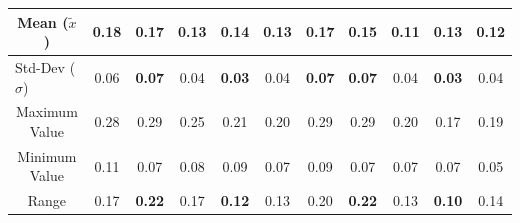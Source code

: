 \begin{itemize}
\begin{table}[htbp]
{\begin{tabular}{@{}ccccccccccc@{}}
      \multicolumn{1}{c|}{Mean ($\tilde{x}$)}                                            & \cellcolor[HTML]{CB0000}\textbf{0.18} & \cellcolor[HTML]{FFFFFF}0.17           & \cellcolor[HTML]{32CB00}\textbf{0.13} & \cellcolor[HTML]{FFFFFF}0.14           & \multicolumn{1}{c|}{\cellcolor[HTML]{32CB00}\textbf{0.13}} & \cellcolor[HTML]{CB0000}\textbf{0.17} & \cellcolor[HTML]{FFFFFF}0.15           & \cellcolor[HTML]{32CB00}\textbf{0.11} & \cellcolor[HTML]{FFFFFF}0.13           & \multicolumn{1}{c|}{\cellcolor[HTML]{FFFFFF}0.12}  \\ \midrule
      \multicolumn{1}{l|}{Std-Dev ($\sigma$)}                                            & \cellcolor[HTML]{FFFFFF}0.06          & \cellcolor[HTML]{CB0000}\textbf{0.07}  & \cellcolor[HTML]{FFFFFF}0.04          & \cellcolor[HTML]{32CB00}\textbf{0.03}  & \multicolumn{1}{c|}{\cellcolor[HTML]{FFFFFF}0.04}          & \cellcolor[HTML]{CB0000}\textbf{0.07} & \cellcolor[HTML]{CB0000}\textbf{0.07}  & \cellcolor[HTML]{FFFFFF}0.04          & \cellcolor[HTML]{32CB00}\textbf{0.03}  & \multicolumn{1}{c|}{\cellcolor[HTML]{FFFFFF}0.04}  \\ \midrule
      \multicolumn{1}{c|}{Maximum Value}                                                 & \cellcolor[HTML]{FFFFFF}0.28          & \cellcolor[HTML]{FFFFFF}0.29           & \cellcolor[HTML]{FFFFFF}0.25          & \cellcolor[HTML]{FFFFFF}0.21           & \multicolumn{1}{c|}{\cellcolor[HTML]{FFFFFF}0.20}          & \cellcolor[HTML]{FFFFFF}0.29          & \cellcolor[HTML]{FFFFFF}0.29           & \cellcolor[HTML]{FFFFFF}0.20          & \cellcolor[HTML]{FFFFFF}0.17           & \multicolumn{1}{c|}{\cellcolor[HTML]{FFFFFF}0.19}  \\ \midrule
      \multicolumn{1}{c|}{Minimum Value}                                                 & \cellcolor[HTML]{FFFFFF}0.11          & \cellcolor[HTML]{FFFFFF}0.07           & \cellcolor[HTML]{FFFFFF}0.08          & \cellcolor[HTML]{FFFFFF}0.09           & \multicolumn{1}{c|}{\cellcolor[HTML]{FFFFFF}0.07}          & \cellcolor[HTML]{FFFFFF}0.09          & \cellcolor[HTML]{FFFFFF}0.07           & \cellcolor[HTML]{FFFFFF}0.07          & \cellcolor[HTML]{FFFFFF}0.07           & \multicolumn{1}{c|}{\cellcolor[HTML]{FFFFFF}0.05}  \\ \midrule
      \multicolumn{1}{c|}{Range}                                                         & \cellcolor[HTML]{FFFFFF}0.17          & \cellcolor[HTML]{CB0000}\textbf{0.22}  & \cellcolor[HTML]{FFFFFF}0.17          & \cellcolor[HTML]{32CB00}\textbf{0.12}  & \multicolumn{1}{c|}{\cellcolor[HTML]{FFFFFF}0.13}          & \cellcolor[HTML]{FFFFFF}0.20          & \cellcolor[HTML]{CB0000}\textbf{0.22}  & \cellcolor[HTML]{FFFFFF}0.13          & \cellcolor[HTML]{32CB00}\textbf{0.10}  & \multicolumn{1}{c|}{\cellcolor[HTML]{FFFFFF}0.14}  \\ \midrule

\end{tabular}}
\end{table}
\end{itemize}
